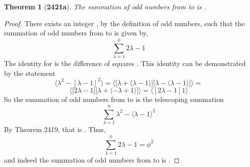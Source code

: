 \documentclass[preview]{standalone}
\newtheorem*{theorem*}{Theorem}
\begin{document}
\begin{theorem*}[\textbf{2421a}]
    The summation of odd numbers from  to \bm{$\phi$} is 
    .
\end{theorem*}

\begin{proof}
    There exists an integer \bm{$\lambda$}, by the definition of odd numbers, such that
    the summation of odd numbers from  to \bm{$\phi$} is given by, 
    \begin{equation*}
        \sum_{\lambda=1}^\phi 
                2 \lambda - 1
    \end{equation*}
    The identity for  is the difference of squares 
    . 
    This identity can be demonstrated by the statement 
    \begin{equation*}
        \bigg \langle \lambda ^2 - [ \lambda - 1 ] ^2 \bigg \rangle
            = 
        \bigg \langle 
            \bigg[ 
                \lambda  + \langle \lambda - 1 \rangle 
            \bigg]
            \bigg[
                \lambda - \langle \lambda - 1 \rangle 
            \bigg] 
        \bigg \rangle
            =
    \end{equation*}
    \begin{equation*} 
        \bigg \langle 
            \bigg[
                2 \lambda - 1
            \bigg]
            \bigg[
                \lambda + \langle - \lambda + 1 \rangle
            \bigg]
        \bigg \rangle
            = 
        \bigg \langle [ 2 \lambda - 1 ] 1 \bigg \rangle
    \end{equation*}
    So the summation of odd numbers from  to \bm{$\phi$} 
    is the telescoping summation
    \begin{equation*}
        \sum_{\lambda=1}^\phi 
                \lambda ^2 - \langle \lambda - 1 \rangle ^2
    \end{equation*}
    By Theorem 2419, that is . 
    Thus, 
    \begin{equation*}
        \sum_{\lambda=1}^\phi 2 \lambda - 1 = \phi^2
    \end{equation*}
    and indeed the summation of odd numbers from  to \bm{$\phi$} 
    is .
\color{lightgray} \end{proof}
\end{document}
